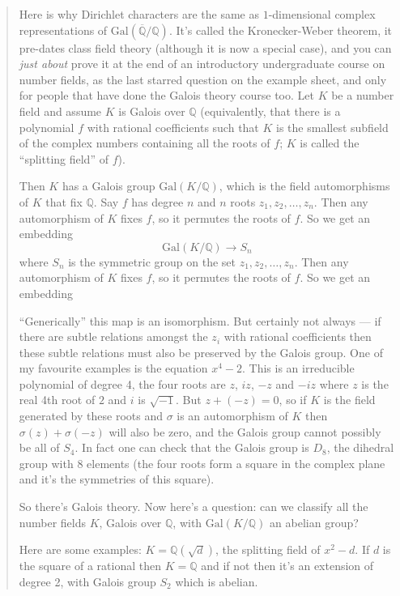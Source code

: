 \documentclass{article}
\begin{document}
\begin{quote}
Here is why Dirichlet characters are the same as \(1\)-dimensional
complex representations of
\(\mathrm{Gal}(\overline{\mathbb{Q}}/\mathbb{Q})\). It's called the
Kronecker-Weber theorem, it pre-dates class field theory (although it is
now a special case), and you can \emph{just about} prove it at the end
of an introductory undergraduate course on number fields, as the last
starred question on the example sheet, and only for people that have
done the Galois theory course too. Let \(K\) be a number field and
assume \(K\) is Galois over \(\mathbb{Q}\) (equivalently, that there is
a polynomial \(f\) with rational coefficients such that \(K\) is the
smallest subfield of the complex numbers containing all the roots of
\(f\); \(K\) is called the ``splitting field'' of \(f\)).

Then \(K\) has a Galois group \(\mathrm{Gal}(K/\mathbb{Q})\), which is
the field automorphisms of \(K\) that fix \(\mathbb{Q}\). Say \(f\) has
degree \(n\) and \(n\) roots \(z_1, z_2, \ldots , z_n\). Then any
automorphism of \(K\) fixes \(f\), so it permutes the roots of \(f\). So
we get an embedding \[\mathrm{Gal}(K/\mathbb{Q}) \to S_n\] where \(S_n\)
is the symmetric group on the set \(z_1, z_2, \ldots , z_n\). Then any
automorphism of \(K\) fixes \(f\), so it permutes the roots of \(f\). So
we get an embedding

``Generically'' this map is an isomorphism. But certainly not always ---
if there are subtle relations amongst the \(z_i\) with rational
coefficients then these subtle relations must also be preserved by the
Galois group. One of my favourite examples is the equation \(x^4-2\).
This is an irreducible polynomial of degree 4, the four roots are \(z\),
\(iz\), \(-z\) and \(-iz\) where \(z\) is the real 4th root of \(2\) and
\(i\) is \(\sqrt{-1}\). But \(z+(-z) = 0\), so if \(K\) is the field
generated by these roots and \(\sigma\) is an automorphism of \(K\) then
\(\sigma(z)+\sigma(-z)\) will also be zero, and the Galois group cannot
possibly be all of \(S_4\). In fact one can check that the Galois group
is \(D_8\), the dihedral group with 8 elements (the four roots form a
square in the complex plane and it's the symmetries of this square).

So there's Galois theory. Now here's a question: can we classify all the
number fields \(K\), Galois over \(\mathbb{Q}\), with
\(\mathrm{Gal}(K/\mathbb{Q})\) an abelian group?

Here are some examples: \(K=\mathbb{Q}(\sqrt{d})\), the splitting field
of \(x^2-d\). If \(d\) is the square of a rational then \(K=\mathbb{Q}\)
and if not then it's an extension of degree 2, with Galois group \(S_2\)
which is abelian.


\end{quote}
\end{document}
